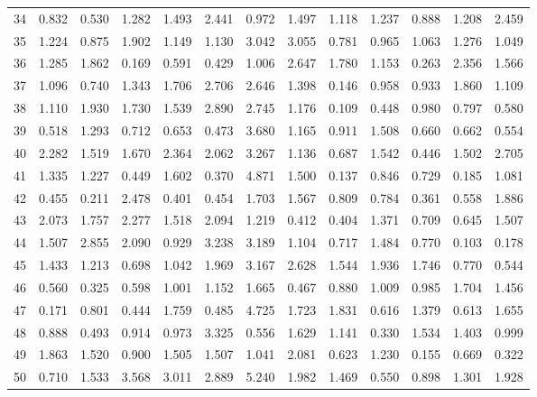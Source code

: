 \begin{tabular}{lrrrrrrrrrrrr}
34  &  0.832 &  0.530 &  1.282 &  1.493 &  2.441 &  0.972 &  1.497 &  1.118 &  1.237 &  0.888 &  1.208 &  2.459 \\
35  &  1.224 &  0.875 &  1.902 &  1.149 &  1.130 &  3.042 &  3.055 &  0.781 &  0.965 &  1.063 &  1.276 &  1.049 \\
36  &  1.285 &  1.862 &  0.169 &  0.591 &  0.429 &  1.006 &  2.647 &  1.780 &  1.153 &  0.263 &  2.356 &  1.566 \\
37  &  1.096 &  0.740 &  1.343 &  1.706 &  2.706 &  2.646 &  1.398 &  0.146 &  0.958 &  0.933 &  1.860 &  1.109 \\
38  &  1.110 &  1.930 &  1.730 &  1.539 &  2.890 &  2.745 &  1.176 &  0.109 &  0.448 &  0.980 &  0.797 &  0.580 \\
39  &  0.518 &  1.293 &  0.712 &  0.653 &  0.473 &  3.680 &  1.165 &  0.911 &  1.508 &  0.660 &  0.662 &  0.554 \\
40  &  2.282 &  1.519 &  1.670 &  2.364 &  2.062 &  3.267 &  1.136 &  0.687 &  1.542 &  0.446 &  1.502 &  2.705 \\
41  &  1.335 &  1.227 &  0.449 &  1.602 &  0.370 &  4.871 &  1.500 &  0.137 &  0.846 &  0.729 &  0.185 &  1.081 \\
42  &  0.455 &  0.211 &  2.478 &  0.401 &  0.454 &  1.703 &  1.567 &  0.809 &  0.784 &  0.361 &  0.558 &  1.886 \\
43  &  2.073 &  1.757 &  2.277 &  1.518 &  2.094 &  1.219 &  0.412 &  0.404 &  1.371 &  0.709 &  0.645 &  1.507 \\
44  &  1.507 &  2.855 &  2.090 &  0.929 &  3.238 &  3.189 &  1.104 &  0.717 &  1.484 &  0.770 &  0.103 &  0.178 \\
45  &  1.433 &  1.213 &  0.698 &  1.042 &  1.969 &  3.167 &  2.628 &  1.544 &  1.936 &  1.746 &  0.770 &  0.544 \\
46  &  0.560 &  0.325 &  0.598 &  1.001 &  1.152 &  1.665 &  0.467 &  0.880 &  1.009 &  0.985 &  1.704 &  1.456 \\
47  &  0.171 &  0.801 &  0.444 &  1.759 &  0.485 &  4.725 &  1.723 &  1.831 &  0.616 &  1.379 &  0.613 &  1.655 \\
48  &  0.888 &  0.493 &  0.914 &  0.973 &  3.325 &  0.556 &  1.629 &  1.141 &  0.330 &  1.534 &  1.403 &  0.999 \\
49  &  1.863 &  1.520 &  0.900 &  1.505 &  1.507 &  1.041 &  2.081 &  0.623 &  1.230 &  0.155 &  0.669 &  0.322 \\
50  &  0.710 &  1.533 &  3.568 &  3.011 &  2.889 &  5.240 &  1.982 &  1.469 &  0.550 &  0.898 &  1.301 &  1.928 \\

\end{tabular}
